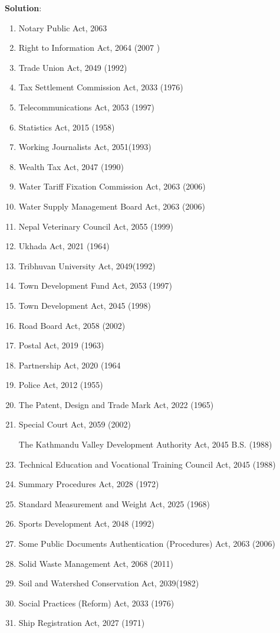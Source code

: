\documentclass[
  openany]{book}
\newenvironment{solution}{ {\bfseries Solution}:}{}
\begin{document}
\begin{questions}
\begin{solution}
\begin{enumerate}
\item Notary Public Act, 2063
\item Right to Information Act, 2064 (2007 )
\item Trade Union Act, 2049 (1992)
\item Tax Settlement Commission Act, 2033 (1976)
\item Telecommunications Act, 2053 (1997)
\item Statistics Act, 2015 (1958)
\item Working Journalists Act, 2051(1993)
\item Wealth Tax Act, 2047 (1990)
\item Water Tariff Fixation Commission Act, 2063 (2006)
\item Water Supply Management Board Act, 2063 (2006)
\item Nepal Veterinary Council Act, 2055 (1999)
\item Ukhada Act, 2021 (1964)
\item Tribhuvan University Act, 2049(1992)
\item Town Development Fund Act, 2053 (1997)
\item Town Development Act, 2045 (1998)
\item Road Board Act, 2058 (2002)
\item Postal Act, 2019 (1963)
\item Partnership Act, 2020 (1964
\item Police Act, 2012 (1955)
\item The Patent, Design and Trade Mark Act, 2022 (1965)
\item Special Court Act, 2059 (2002)
\item [The] Kathmandu Valley Development Authority Act, 2045 B.S. (1988)
\item Technical Education and Vocational Training Council Act, 2045 (1988)
\item Summary Procedures Act, 2028 (1972)
\item Standard Measurement and Weight Act, 2025 (1968)
\item Sports Development Act, 2048 (1992)
\item Some Public Documents Authentication (Procedures) Act, 2063 (2006)
\item Solid Waste Management Act, 2068 (2011)
\item Soil and Watershed Conservation Act, 2039(1982)
\item Social Practices (Reform) Act, 2033 (1976)
\item Ship Registration Act, 2027 (1971)

\end{enumerate}
\end{solution}
\end{questions}
\end{document}
